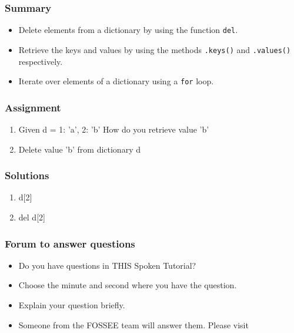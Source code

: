 \documentclass[17pt]{beamer}
\begin{document}
\begin{frame}
\frametitle{Summary}
\label{sec-8.2}

\begin{itemize}
\item Delete elements from a dictionary by using the function \texttt{del}.\pause
\item Retrieve the keys and values by using the methods \texttt{.keys()} and 
    \texttt{.values()} respectively.\pause
\item Iterate over elements of a dictionary using a \texttt{for} loop.
\end{itemize}
\end{frame}
\begin{frame}[fragile]
\frametitle{Assignment}
\label{sec-9.1}

\begin{enumerate}
\item Given d = {1: 'a', 2: 'b'}
How do you retrieve value 'b'\pause
\item Delete value 'b' from dictionary d
\end{enumerate}
\end{frame}
\begin{frame}
\frametitle{Solutions}
\label{sec-10}

\begin{enumerate}
\item d[2] \pause
\vspace{15pt}
\item del d[2] 
\end{enumerate}
\end{frame}
\begin{frame}
\frametitle{Forum to answer questions}
\begin{itemize}
\item Do you have questions in THIS Spoken Tutorial?
\item Choose the minute and second where you have the question.
\item Explain your question briefly.
\item Someone from the FOSSEE team will answer them. Please visit 
\end{itemize}
\begin{center}
{\color{blue}{http://forums.spoken-tutorial.org/}}
 \end{center} 
\end{frame}
\end{document}

